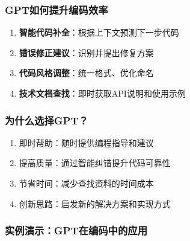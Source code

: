 \hypertarget{gptux5982ux4f55ux63d0ux5347ux7f16ux7801ux6548ux7387}{%
  \subsubsection{GPT如何提升编码效率}\label{gptux5982ux4f55ux63d0ux5347ux7f16ux7801ux6548ux7387}}

\begin{enumerate}
  \def\labelenumi{\arabic{enumi}.}

  \item
        \textbf{智能代码补全}：根据上下文预测下一步代码
  \item
        \textbf{错误修正建议}：识别并提出修复方案
  \item
        \textbf{代码风格调整}：统一格式、优化命名
  \item
        \textbf{技术文档查找}：即时获取API说明和使用示例
\end{enumerate}

\hypertarget{ux4e3aux4ec0ux4e48ux9009ux62e9gpt-1}{%
  \subsubsection{为什么选择GPT？}\label{ux4e3aux4ec0ux4e48ux9009ux62e9gpt-1}}

\begin{enumerate}
  \def\labelenumi{\arabic{enumi}.}

  \item
        即时帮助：随时提供编程指导和建议
  \item
        提高质量：通过智能纠错提升代码可靠性
  \item
        节省时间：减少查找资料的时间成本
  \item
        创新思路：启发新的解决方案和实现方式
\end{enumerate}

\hypertarget{ux5b9eux4f8bux6f14ux793agptux5728ux7f16ux7801ux4e2dux7684ux5e94ux7528}{%
  \subsubsection{实例演示：GPT在编码中的应用}\label{ux5b9eux4f8bux6f14ux793agptux5728ux7f16ux7801ux4e2dux7684ux5e94ux7528}}

